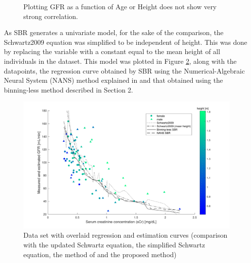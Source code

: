 \documentclass[10pt,final]{siamltex}
\begin{document}
\begin{figure}[ht]
  \centering
  \caption{Plotting GFR as a function of Age or Height does not show very strong correlation.}
  \label{recessive}
\end{figure}

As SBR generates a univariate model, for the sake of the comparison, the Schwartz2009 equation was simplified to be independent of height. This was done by replacing the variable with a constant equal to the mean height of all individuals in the dataset. This model was plotted in Figure \ref{regression}, along with the datapoints, the regression curve obtained by SBR using the Numerical-Algebraic Neural System (NANS) method explained in \cite{fiori} and that obtained using the binning-less method described in Section 2.

\begin{figure}[ht]
  \centering
  \includegraphics[scale=0.6]{figures/regression}
  \caption{Data set with overlaid regression and estimation curves (comparison with the updated Schwartz equation, the simplified Schwartz equation, the method of \cite{fiori} and the proposed method)}
  \label{regression}
\end{figure}
\end{document}
